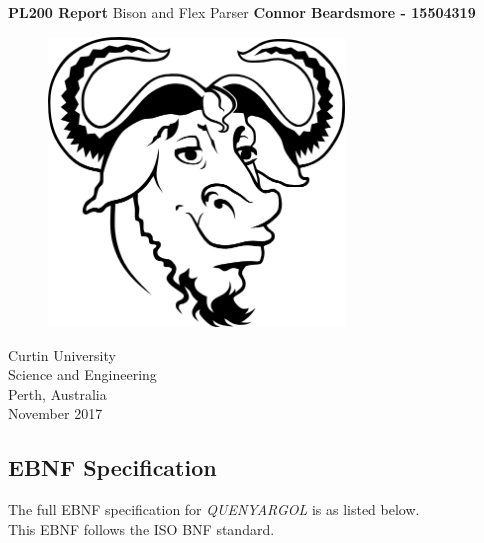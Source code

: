 \documentclass[]{article}
\begin{document}


	

\begin{titlepage}
	\begin{center}
		\vspace*{1cm}
		\LARGE\textbf{PL200 Report}
		\break
		Bison and Flex Parser
		\vspace{1cm}
		\break
		\Large\textbf{Connor Beardsmore - 15504319} 
		\vspace{2cm}
		\begin{figure}[H]
			\begin{center}
				{ 
					\includegraphics[height=0.4\textheight,width=0.7\textwidth]{placeholder.png}}
			\end{center}
		\end{figure}
		
		\vspace{4cm}
		\normalsize
		Curtin University \\
		Science and Engineering \\
		Perth, Australia \\
		November 2017
		
	\end{center}
\end{titlepage}


\begin{center}
	\section*{EBNF Specification}
\end{center}
\vspace{0.5cm}
The full EBNF specification for \textit{QUENYARGOL} is as listed below. \\This EBNF follows the ISO BNF standard.
\vspace{1cm}
\end{document}
